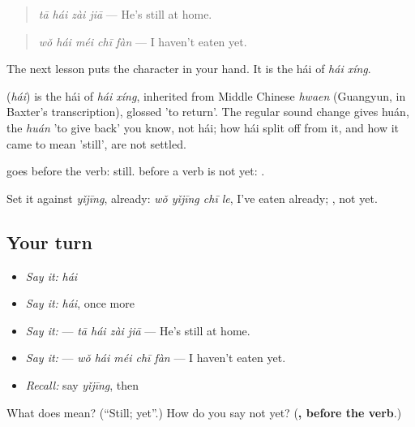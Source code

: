 \begin{quote}
\textbf{} \emph{tā hái zài jiā} — He's still at home.
\end{quote}

\begin{quote}
\textbf{} \emph{wǒ hái méi chī fàn} — I haven't eaten yet.
\end{quote}

The next lesson puts the character in your hand. It is the hái of \emph{hái xíng}.

\begin{cousinweb}
\textbf{} (\emph{hái}) is the hái of \emph{hái xíng}, inherited from Middle Chinese \emph{hwaen} (Guangyun, in Baxter's transcription), glossed 'to return'. The regular sound change gives huán, the \emph{huán} 'to give back' you know, not hái; how hái split off from it, and how it came to mean 'still', are not settled.
\end{cousinweb}

\begin{grammarlens}[title={What you've built}]
 goes before the verb: still.  before a verb is not yet: .

Set it against \emph{yǐjīng}, already: \emph{wǒ yǐjīng chī le}, I've eaten already; , not yet.
\end{grammarlens}

\subsection*{Your turn}
\begin{itemize}
\raggedright
  \item \emph{Say it:} \emph{hái}
  \item \emph{Say it:} \emph{hái}, once more
  \item \emph{Say it:}  — \emph{tā hái zài jiā} — He's still at home.
  \item \emph{Say it:}  — \emph{wǒ hái méi chī fàn} — I haven't eaten yet.
  \item \emph{Recall:} say \emph{yǐjīng}, then 
\end{itemize}

\begin{tcolorbox}[breakable,colback=teal!4,colframe=teal!35!black,title={Before you move on}]
What does  mean? (\textquotedblleft{}Still; yet\textquotedblright{}.) How do you say not yet? (\textbf{, before the verb}.)
\end{tcolorbox}
